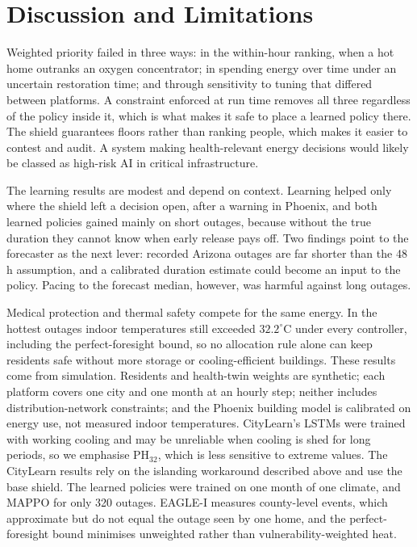 \documentclass[conference]{IEEEtran}
\begin{document}
\section{Discussion and Limitations}
Weighted priority failed in three ways: in the within-hour ranking, when a hot home outranks an oxygen concentrator; in spending energy over time under an uncertain restoration time; and through sensitivity to tuning that differed between platforms. A constraint enforced at run time removes all three regardless of the policy inside it, which is what makes it safe to place a learned policy there. The shield guarantees floors rather than ranking people, which makes it easier to contest and audit. A system making health-relevant energy decisions would likely be classed as high-risk AI in critical infrastructure.

The learning results are modest and depend on context. Learning helped only where the shield left a decision open, after a warning in Phoenix, and both learned policies gained mainly on short outages, because without the true duration they cannot know when early release pays off. Two findings point to the forecaster as the next lever: recorded Arizona outages are far shorter than the 48\,h assumption, and a calibrated duration estimate could become an input to the policy. Pacing to the forecast median, however, was harmful against long outages.

Medical protection and thermal safety compete for the same energy. In the hottest outages indoor temperatures still exceeded $32.2^\circ$C under every controller, including the perfect-foresight bound, so no allocation rule alone can keep residents safe without more storage or cooling-efficient buildings. These results come from simulation. Residents and health-twin weights are synthetic; each platform covers one city and one month at an hourly step; neither includes distribution-network constraints; and the Phoenix building model is calibrated on energy use, not measured indoor temperatures. CityLearn's LSTMs were trained with working cooling and may be unreliable when cooling is shed for long periods, so we emphasise PH$_{32}$, which is less sensitive to extreme values. The CityLearn results rely on the islanding workaround described above and use the base shield. The learned policies were trained on one month of one climate, and MAPPO for only 320 outages. EAGLE-I measures county-level events, which approximate but do not equal the outage seen by one home, and the perfect-foresight bound minimises unweighted rather than vulnerability-weighted heat.
\end{document}
